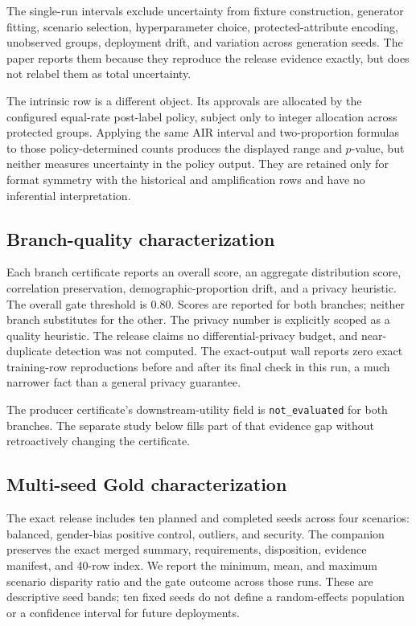 The single-run intervals exclude uncertainty from fixture construction, generator fitting,
scenario selection, hyperparameter choice, protected-attribute encoding, unobserved groups,
deployment drift, and variation across generation seeds. The paper reports them because they
reproduce the release evidence exactly, but does not relabel them as total uncertainty.

The intrinsic row is a different object. Its approvals are allocated by the configured equal-rate
post-label policy, subject only to integer allocation across protected groups. Applying the same
AIR interval and two-proportion formulas to those policy-determined counts produces the displayed
range and $p$-value, but neither measures uncertainty in the policy output. They are retained only
for format symmetry with the historical and amplification rows and have no inferential
interpretation.

\subsection{Branch-quality characterization}

Each branch certificate reports an overall score, an aggregate distribution score, correlation
preservation, demographic-proportion drift, and a privacy heuristic. The overall gate threshold is
0.80. Scores are reported for both branches; neither branch substitutes for the other. The privacy
number is explicitly scoped as a quality heuristic. The release claims no differential-privacy
budget, and near-duplicate detection was not computed. The exact-output wall reports zero exact
training-row reproductions before and after its final check in this run, a much narrower fact than
a general privacy guarantee.

The producer certificate's downstream-utility field is \texttt{not\_evaluated} for both branches.
The separate study below fills part of that evidence gap without retroactively changing the
certificate.

\subsection{Multi-seed Gold characterization}

The exact release includes ten planned and completed seeds across four scenarios: balanced,
gender-bias positive control, outliers, and security. The companion preserves the exact merged
summary, requirements, disposition, evidence manifest, and 40-row index. We report the minimum,
mean, and maximum scenario disparity ratio and the gate outcome across those runs. These are
descriptive seed bands; ten fixed seeds do not define a random-effects population or a confidence
interval for future deployments.

